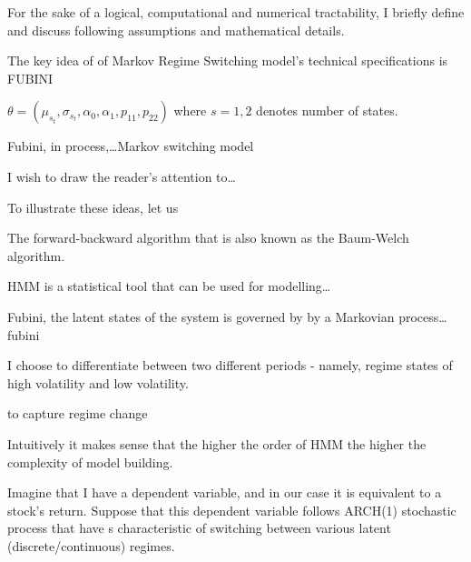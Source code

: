 \documentclass[a4paper,11pt,english]{article}
\begin{document}
		For the sake of a logical, computational and numerical tractability, I briefly define and discuss following assumptions and mathematical 
		details. 
			
		The key idea of of Markov Regime Switching model's technical specifications is FUBINI
		
		$\theta = \left(\mu_{s_t}, \sigma_{s_t}, \alpha_0, \alpha_1, p_{11}, p_{22}\right)$ where $s=1,2$ denotes number of states.
	
		
		Fubini, in process,\ldots Markov switching model
		
		I wish to draw the reader's attention to\ldots  
		
		To illustrate these ideas, let us 
		

		The forward-backward algorithm that is also known as the Baum-Welch algorithm.

		HMM is a statistical tool that can be used for modelling\ldots
		
		Fubini, the latent states of the system is governed by by a Markovian process\ldots fubini

		I choose to differentiate between two different periods - namely, regime states of high volatility and low volatility.
		
		to capture regime change 
		
		Intuitively it makes sense that the higher the order of HMM the higher the complexity of model building.		
		

		


		
		Imagine that I have a dependent variable, and in our case it is equivalent to a stock's return. Suppose that this dependent variable follows 
		ARCH(1) stochastic process that have s characteristic of switching between various latent (discrete/continuous) regimes. 
		
\end{document}
